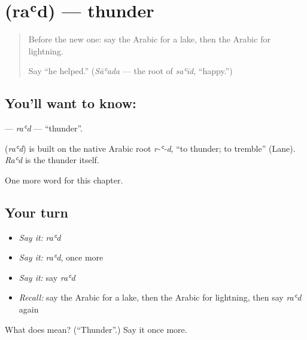 \section[\texorpdfstring{\ar{رعد} (raʿd)}{رعد (raʿd)}]{ (raʿd) — thunder}

\label{lesson:AR-C133-rad}



\begin{quote}
Before the new one: say the Arabic for a lake, then the Arabic for lightning.

Say \textquotedblleft{}he helped.\textquotedblright{} (\emph{Sāʿada} — the root of \emph{saʿīd}, \textquotedblleft{}happy.\textquotedblright{})
\end{quote}

\subsection*{You'll want to know: }
\textbf{} — \emph{raʿd} — \textquotedblleft{}thunder\textquotedblright{}.

\begin{cousinweb}
\textbf{} (\emph{raʿd}) is built on the native Arabic root \emph{r-ʿ-d}, \textquotedblleft{}to thunder; to tremble\textquotedblright{} (Lane). \emph{Raʿd} is the thunder itself.
\end{cousinweb}

\begin{grammarlens}[title={What you've built}]
One more word for this chapter.
\end{grammarlens}

\subsection*{Your turn}
\begin{itemize}
\raggedright
  \item \emph{Say it:} \emph{raʿd}
  \item \emph{Say it:} \emph{raʿd}, once more
  \item \emph{Say it:} say \emph{raʿd}
  \item \emph{Recall:} say the Arabic for a lake, then the Arabic for lightning, then say \emph{raʿd} again
\end{itemize}

\begin{tcolorbox}[breakable,colback=teal!4,colframe=teal!35!black,title={Before you move on}]
What does  mean? (\textquotedblleft{}Thunder\textquotedblright{}.) Say it once more.
\end{tcolorbox}

